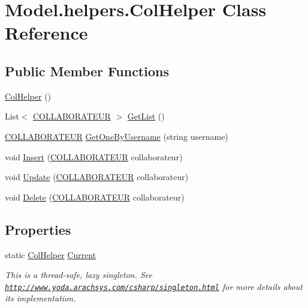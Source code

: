 \hypertarget{class_model_1_1helpers_1_1_col_helper}{\section{Model.\-helpers.\-Col\-Helper Class Reference}
\label{class_model_1_1helpers_1_1_col_helper}
}
\subsection*{Public Member Functions}
\begin{DoxyCompactItemize}
\item 
\hyperlink{class_model_1_1helpers_1_1_col_helper_ad5b304defcf14840c15d8eca532b7c83}{Col\-Helper} ()
\item 
List$<$ \hyperlink{class_model_1_1_c_o_l_l_a_b_o_r_a_t_e_u_r}{C\-O\-L\-L\-A\-B\-O\-R\-A\-T\-E\-U\-R} $>$ \hyperlink{class_model_1_1helpers_1_1_col_helper_ac171a9c499134d6055fb8ce91ddccd52}{Get\-List} ()
\item 
\hyperlink{class_model_1_1_c_o_l_l_a_b_o_r_a_t_e_u_r}{C\-O\-L\-L\-A\-B\-O\-R\-A\-T\-E\-U\-R} \hyperlink{class_model_1_1helpers_1_1_col_helper_a581e30cc28ca598085208bce82c4388a}{Get\-One\-By\-Username} (string username)
\item 
void \hyperlink{class_model_1_1helpers_1_1_col_helper_a3d832ad4e389ffdd00eb41e94ee0dc5d}{Insert} (\hyperlink{class_model_1_1_c_o_l_l_a_b_o_r_a_t_e_u_r}{C\-O\-L\-L\-A\-B\-O\-R\-A\-T\-E\-U\-R} collaborateur)
\item 
void \hyperlink{class_model_1_1helpers_1_1_col_helper_a2d161545f0caaba88414294fd80b36e6}{Update} (\hyperlink{class_model_1_1_c_o_l_l_a_b_o_r_a_t_e_u_r}{C\-O\-L\-L\-A\-B\-O\-R\-A\-T\-E\-U\-R} collaborateur)
\item 
void \hyperlink{class_model_1_1helpers_1_1_col_helper_ad4eb731348d488e60a7e05bf4f8e60c7}{Delete} (\hyperlink{class_model_1_1_c_o_l_l_a_b_o_r_a_t_e_u_r}{C\-O\-L\-L\-A\-B\-O\-R\-A\-T\-E\-U\-R} collaborateur)
\end{DoxyCompactItemize}
\subsection*{Properties}
\begin{DoxyCompactItemize}
\item 
static \hyperlink{class_model_1_1helpers_1_1_col_helper}{Col\-Helper} \hyperlink{class_model_1_1helpers_1_1_col_helper_ac7aec6cd333abdb9d6a857fdb67330ae}{Current}
\begin{DoxyCompactList}\small\item\em This is a thread-\/safe, lazy singleton. See \href{http://www.yoda.arachsys.com/csharp/singleton.html}{\tt http\-://www.\-yoda.\-arachsys.\-com/csharp/singleton.\-html} for more details about its implementation. \end{DoxyCompactList}\end{DoxyCompactItemize}



